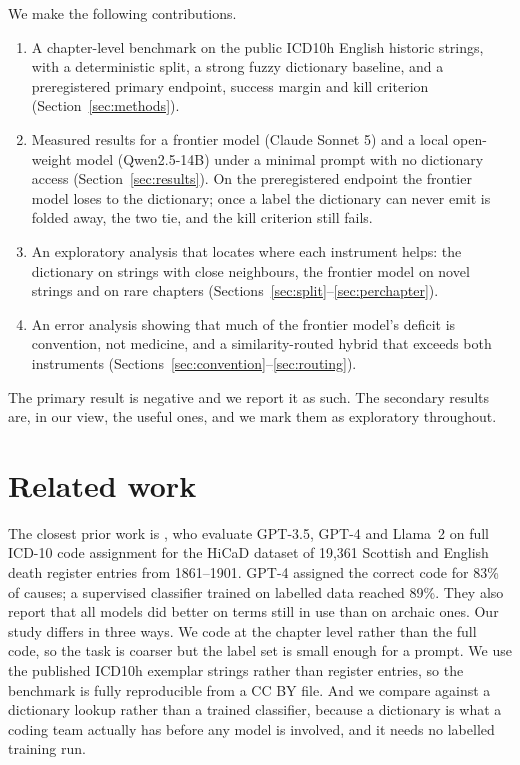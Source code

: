 \documentclass[11pt]{article}
\begin{document}
We make the following contributions.
\begin{enumerate}
  \item A chapter-level benchmark on the public ICD10h English historic strings, with a deterministic split, a strong fuzzy dictionary baseline, and a preregistered primary endpoint, success margin and kill criterion (Section~\ref{sec:methods}).
  \item Measured results for a frontier model (Claude Sonnet 5) and a local open-weight model (Qwen2.5-14B) under a minimal prompt with no dictionary access (Section~\ref{sec:results}). On the preregistered endpoint the frontier model loses to the dictionary; once a label the dictionary can never emit is folded away, the two tie, and the kill criterion still fails.
  \item An exploratory analysis that locates where each instrument helps: the dictionary on strings with close neighbours, the frontier model on novel strings and on rare chapters (Sections~\ref{sec:split}--\ref{sec:perchapter}).
  \item An error analysis showing that much of the frontier model's deficit is convention, not medicine, and a similarity-routed hybrid that exceeds both instruments (Sections~\ref{sec:convention}--\ref{sec:routing}).
\end{enumerate}

The primary result is negative and we report it as such. The secondary results are, in our view, the useful ones, and we mark them as exploratory throughout.

\section{Related work}

The closest prior work is \citet{pedersen2024coding}, who evaluate GPT-3.5, GPT-4 and Llama~2 on full ICD-10 code assignment for the HiCaD dataset of 19,361 Scottish and English death register entries from 1861--1901. GPT-4 assigned the correct code for 83\% of causes; a supervised classifier trained on labelled data reached 89\%. They also report that all models did better on terms still in use than on archaic ones. Our study differs in three ways. We code at the chapter level rather than the full code, so the task is coarser but the label set is small enough for a prompt. We use the published ICD10h exemplar strings rather than register entries, so the benchmark is fully reproducible from a CC BY file. And we compare against a dictionary lookup rather than a trained classifier, because a dictionary is what a coding team actually has before any model is involved, and it needs no labelled training run.
\end{document}

